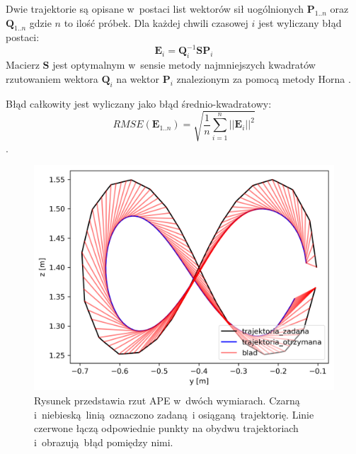 Dwie trajektorie są opisane w~postaci list wektorów sił uogólnionych $\boldsymbol{P}_{1..n}$ oraz $\boldsymbol{Q}_{1..n}$ gdzie $n$ to ilość próbek. Dla każdej chwili czasowej $i$ jest wyliczany błąd postaci:
\begin{equation}
\boldsymbol{E}_i = \boldsymbol{Q}_i^{-1}\boldsymbol{S}\boldsymbol{P}_i
\end{equation}
Macierz $\boldsymbol{S}$ jest optymalnym w~sensie metody najmniejszych kwadratów rzutowaniem wektora $\boldsymbol{Q}_i$ na wektor $\boldsymbol{P}_i$ znalezionym za pomocą metody Horna \cite{bib:horn}. 

Błąd całkowity jest wyliczany jako błąd średnio-kwadratowy:
\begin{equation}
RMSE(\boldsymbol{E}_{1..n}) = \sqrt{\frac{1}{n}\sum_{i=1}^{n}||\boldsymbol{E}_i||^2}
\end{equation}.



\begin{figure}
	\centering
		\includegraphics[width=.45\textwidth]{./velma/przerobione_testy/out/osemka/yz_ate_plot_podnoszenie_miekki_bez_brak.png}
		\caption{Rysunek przedstawia rzut APE w~dwóch wymiarach. Czarną i~niebieską linią oznaczono zadaną i osiąganą trajektorię. Linie czerwone łączą odpowiednie punkty na obydwu trajektoriach i~obrazują błąd pomiędzy nimi.}
		\label{fig:przykl_ape}
\end{figure}




